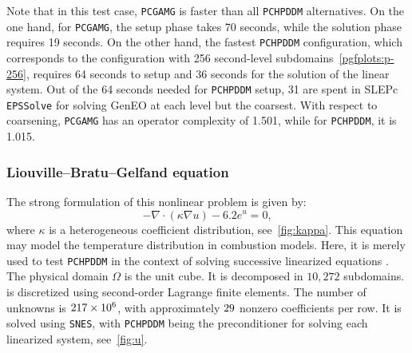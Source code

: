 \documentclass[3p,11pt]{elsarticle}
\newcommand{\pk}[1]{\texttt{#1}}
\begin{document}
Note that in this test case, \pk{PCGAMG} is faster than all \pk{PCHPDDM}
alternatives. On the one hand, for \pk{PCGAMG}, the setup phase takes 70 seconds, while the solution phase requires 19 seconds.
On the other hand, the fastest \pk{PCHPDDM} configuration, which corresponds to the
configuration with 256 second-level subdomains~\ref{pgfplots:p-256}, requires
64 seconds to setup and 36 seconds for the solution of the linear system.
Out of the 64 seconds needed for \pk{PCHPDDM} setup, 31 are spent in SLEPc
\pk{EPSSolve} for solving GenEO at each level but the coarsest. With respect to
coarsening, \pk{PCGAMG} has an operator complexity of 1.501, while for \pk{PCHPDDM},
it is 1.015.
    \subsubsection{Liouville--Bratu--Gelfand equation} The strong formulation of this nonlinear problem is given by:
\begin{equation}
    -\nabla \cdot (\kappa \nabla u) - 6.2 e^u = 0,\label{eq:bratu}
\end{equation}
where $\kappa$ is a heterogeneous coefficient distribution,
see~\cref{fig:kappa}. This equation may model the temperature distribution in
combustion models. Here, it is merely used to test \pk{PCHPDDM} in the context
of solving successive linearized equations%
. The physical domain $\Omega$ is the unit cube. It is decomposed in $10{,}272$ subdomains.
 is discretized using second-order Lagrange finite elements.
The number of unknowns is $\pgfmathprintnumber{217} \times 10^6$, with
approximately $\pgfmathprintnumber{29}$ nonzero coefficients per row.
It is solved using \pk{SNES}, with \pk{PCHPDDM} being the preconditioner for
solving each linearized system, see~\cref{fig:u}.
\end{document}

